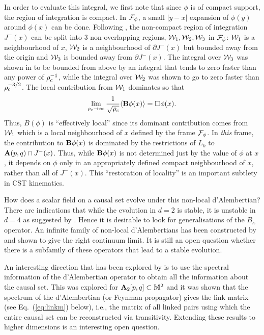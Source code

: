 In order to evaluate this integral, we first note that since $\phi$ is of compact support, the region of integration
is compact.  In $\mathcal F_\phi$, a
small $|y-x|$ expansion of  $\phi(y)$ around $\phi(x)$ can be done.  Following \cite{sorkinnonlocal,bd,dionthesis},  the non-compact region
of integration $J^-(x)$ can be  split into 3 non-overlapping regions,
$\mathcal W_1,\mathcal W_2,\mathcal W_3$ in $\mathcal F_\phi$:  $\mathcal W_1$ is  a neighbourhood of $x$,  $\mathcal W_2$ is a neighbourhood of $\partial J^-(x)$ but
bounded away from the origin and $\mathcal W_3$ is bounded away from $\partial J^-(x)$.  The integral over  $\mathcal W_3$ was shown
in \cite{dionthesis} to be bounded from above by an integral that  tends to zero faster than any power of $\rho_c^{-1}$, while
the integral over $\mathcal W_2$ was shown to go to zero faster than $\rho_c^{-3/2}$.  The local contribution from $\mathcal W_1$  
dominates so that 
\begin{equation} 
\lim_{\rho_c \rightarrow \infty} \frac{1}{\sqrt{\rho_c }}\langle {\mathbf B\phi(x)} \rangle = \Box \phi(x). 
\end{equation}  
Thus, $B(\phi)$ is  ``effectively local'' since its dominant contribution comes from $\mathcal W_1$ which is a local
neighbourhood of $x$ defined by the frame $\mathcal F_\phi$.  In \emph{this}  frame, the contribution to $\mathbf B\phi(x)$ is
dominated by the restrictions of $L_k$ to $\mathbf A(p,q)\cap J^-(x)$. Thus,   while $\mathbf B\phi(x)$ is not determined just by
the value of $\phi$ at $x$, it depends on $\phi$ only in  an appropriately defined compact neighbourhood of $x$,
rather than all of $J^-(x)$.  This ``restoration of locality'' is an important subtlety in CST kinematics.

How does a scalar field on a causal set evolve under this non-local d'Alembertian?  There are indications that while the
evolution in $d=2$ is stable, it is  unstable in $d=4$ as suggested by \cite{gendalem}. Hence it is  desirable to look for
generalisations  of the $B_\kappa$ operator.  An infinite family of  non-local d'Alembertians has been constructed by 
\cite{gendalem} and shown to give the right continuum limit. It is still an open question whether there is a subfamily of
these operators that lead to a  stable evolution.

An interesting direction that has been explored by \cite{yasamanspectral} is to use the spectral information of the
d'Alembertian operator to obtain all the information about the causal set. This was explored for $\mathbf A_2[p,q] \subset
\mathbb M^2$ and it  was shown that the spectrum of the d'Alembertian (or Feynman propagator) gives the link matrix (see
Eq.~(\ref{eq:linkm}) below), i.e., the matrix of all linked pairs using which the  entire causal set can be reconstructed
via transitivity. Extending these results to higher dimensions is an interesting open question.   

